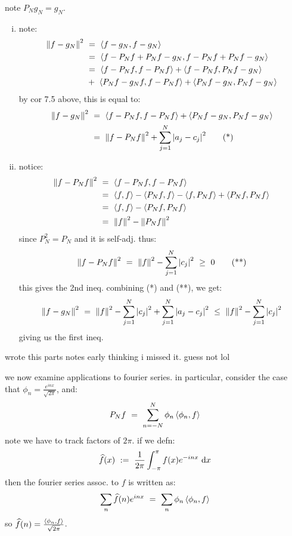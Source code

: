 \begin{pf}
	note $P_{N}g_{N}=g_{N}$.
	\begin{enumerate}[i)]
		\item note:
			\begin{align*}
				\norm{f-g_{N}}^{2}
				& \ = \ \ang{f-g_{N},f-g_{N}} \\
				& \ = \ \ang{f-P_{N}f+P_{N}f-g_{N},f-P_{N}f+P_{N}f-g_{N}} \\
				& \ = \ \ang{f-P_{N}f,f-P_{N}f} + \ang{f-P_{N}f,P_{N}f-g_{N}} \\
				& \ + \ \ang{P_{N}f-g_{N}f,f-P_{N}f} + \ang{P_{N}f-g_{N},P_{N}f-g_{N}}
			\end{align*}
		by cor 7.5 above, this is equal to:
		\begin{align*}
			\norm{f-g_{N}}^{2} & \ = \ \ang{f-P_{N}f,f-P_{N}f}+\ang{P_{N}f-g_{N},P_{N}f-g_{N}} \\
			& \ = \ \norm{f-P_{N}f}^{2} + \sum_{j=1}^{N}\abs{a_{j}-c_{j}}^{2} \tag*{(*)}
		\end{align*}

	\item notice:
		\begin{align*}
			\norm{f-P_{N}f}^{2}
			& \ = \ \ang{f-P_{N}f,f-P_{N}f} \\
			& \ = \ \ang{f,f}-\ang{P_{N}f,f}-\ang{f,P_{N}f}+\ang{P_{N}f,P_{N}f} \\
			& \ = \ \ang{f,f}-\ang{P_{N}f,P_{N}f} \\
			& \ = \ \norm{f}^{2}-\norm{P_{N}f}^{2}
		\end{align*}
		since $P_{N}^{2}=P_{N}$ and it is self-adj. thus:
		\begin{equation*}
			\left\|f-P_{N}f\right\|^{2} \ = \ \left\|f\right\|^{2} - \sum_{j=1}^{N}\abs{c_{j}}^{2}
			\ \geq \ 0 \tag*{(**)}
		\end{equation*}
		this gives the 2nd ineq.
		combining (*) and (**), we get:
		\begin{equation*}
			\norm{f-g_{N}}^{2} \ = \ \norm{f}^{2}-\sum_{j=1}^{N}\abs{c_{j}}^{2}+\sum_{j=1}^{N}\abs{a_{j}-c_{j}}^{2}
			\ \leq \ \norm{f}^{2} - \sum_{j=1}^{N}\abs{c_{j}}^{2}
		\end{equation*}
		giving us the first ineq.
	\end{enumerate}
\end{pf}

wrote this parts notes early thinking i missed it. guess not lol

we now examine applications to fourier series.
in particular, consider the case that $\phi_{n}=\frac{e^{inx}}{\sqrt{2\pi}}$, and:
\begin{equation*}
	P_{N}f \ = \ \sum_{n=-N}^{N}\phi_{n}\ang{\phi_{n},f}
\end{equation*}
note we have to track factors of $2\pi$. if we defn:
\begin{equation*}
	\hat{f}(x) \ := \ \frac{1}{2\pi}\int_{-\pi}^{\pi}f(x)e^{-inx}\di x
\end{equation*}
then the fourier series assoc. to $f$ is written as:
\begin{equation*}
	\sum_{n}\hat{f}(n)e^{inx} \ = \ \sum_{n}\phi_{n}\ang{\phi_{n},f}
\end{equation*}
so $\widehat{f}(n)=\frac{\left\langle{\phi_{n},f}\right\rangle}{\sqrt{2\pi}}$.

